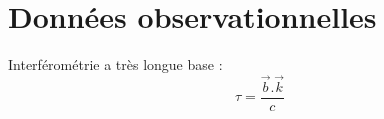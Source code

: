 \section{Données observationnelles}

\begin{frame}
  Interférométrie a très longue base :  
  $$ \tau = \frac{\vec{b}.\vec{k}}{c} $$
\end{frame}


